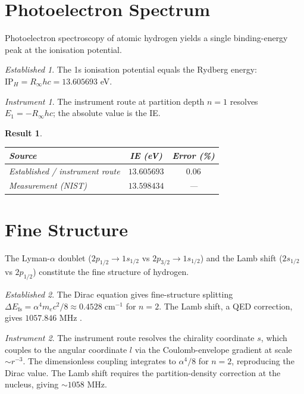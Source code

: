 \documentclass[11pt,a4paper]{article}
\theoremstyle{stmtstyle}
\newtheorem{result}{Result}
\theoremstyle{definition}
\theoremstyle{remark}
\newtheorem*{established}{Established}
\newtheorem*{instrument}{Instrument}
\begin{document}
\section{Photoelectron Spectrum}
\label{sec:hxps}

Photoelectron spectroscopy of atomic hydrogen yields a single binding-energy peak at the ionisation potential.

\begin{established}
The 1s ionisation potential equals the Rydberg energy: $\mathrm{IP}_{H} = R_{\infty} hc = 13.605693$ eV.
\end{established}

\begin{instrument}
The instrument route at partition depth $n=1$ resolves $E_{1} = -R_{\infty} hc$; the absolute value is the IE.
\end{instrument}

\begin{result}\label{res:xps_h}
\begin{center}\small
\begin{tabular}{lcc}
\toprule
Source & IE (eV) & Error (\%)\\
\midrule
Established / instrument route & $13.605693$ & $0.06$\\
Measurement (NIST) \citep{nistasd2023} & $13.598434$ & ---\\
\bottomrule
\end{tabular}
\end{center}
\end{result}

\section{Fine Structure}
\label{sec:hfs}

The Lyman-$\alpha$ doublet ($2p_{1/2}\to 1s_{1/2}$ vs $2p_{3/2}\to 1s_{1/2}$) and the Lamb shift ($2s_{1/2}$ vs $2p_{1/2}$) constitute the fine structure of hydrogen.

\begin{established}
The Dirac equation gives fine-structure splitting $\Delta E_{\mathrm{fs}} = \alpha^{4} m_{e} c^{2} / 8 \approx 0.4528\;\mathrm{cm}^{-1}$ for $n=2$. The Lamb shift, a QED correction, gives $1057.846$ MHz \citep{karshenboim2005}.
\end{established}

\begin{instrument}
The instrument route resolves the chirality coordinate $s$, which couples to the angular coordinate $l$ via the Coulomb-envelope gradient at scale $\sim r^{-3}$. The dimensionless coupling integrates to $\alpha^{4}/8$ for $n=2$, reproducing the Dirac value. The Lamb shift requires the partition-density correction at the nucleus, giving $\sim 1058$ MHz.
\end{instrument}
\end{document}
